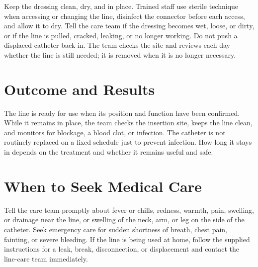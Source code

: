 Keep the dressing clean, dry, and in place. Trained staff use sterile technique when accessing or changing the line, disinfect the connector before each access, and allow it to dry. Tell the care team if the dressing becomes wet, loose, or dirty, or if the line is pulled, cracked, leaking, or no longer working. Do not push a displaced catheter back in. The team checks the site and reviews each day whether the line is still needed; it is removed when it is no longer necessary.

\section*{Outcome and Results}
The line is ready for use when its position and function have been confirmed. While it remains in place, the team checks the insertion site, keeps the line clean, and monitors for blockage, a blood clot, or infection. The catheter is not routinely replaced on a fixed schedule just to prevent infection. How long it stays in depends on the treatment and whether it remains useful and safe.

\section*{When to Seek Medical Care}
Tell the care team promptly about fever or chills, redness, warmth, pain, swelling, or drainage near the line, or swelling of the neck, arm, or leg on the side of the catheter. Seek emergency care for sudden shortness of breath, chest pain, fainting, or severe bleeding. If the line is being used at home, follow the supplied instructions for a leak, break, disconnection, or displacement and contact the line-care team immediately.

